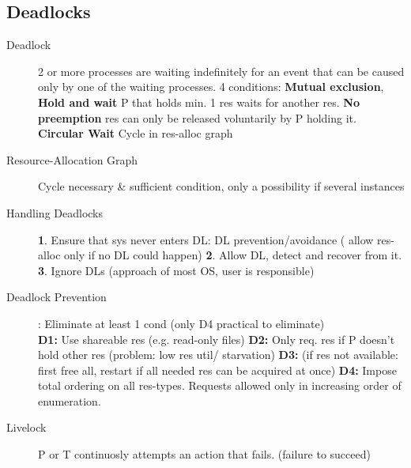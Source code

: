 \subsection*{Deadlocks}
\begin{description}
    \item[Deadlock]2 or more processes are waiting indefinitely for an event that can be caused only by one of the waiting processes. 4 conditions: \textbf{Mutual exclusion}, \textbf{Hold and wait} P that holds min. 1 res waits for another res. \textbf{No preemption} res can only be released voluntarily by P holding it. \textbf{Circular Wait} Cycle in res-alloc graph
    \item[Resource-Allocation Graph] Cycle necessary \& sufficient condition, only a possibility if several instances%
    \item[Handling Deadlocks]\textbf{1}. Ensure that sys never enters DL: DL prevention/avoidance ( allow res-alloc only if no DL could happen) \textbf{2}. Allow DL, detect and recover from it. \textbf{3}. Ignore DLs (approach of most OS, user is responsible)
    \item[Deadlock Prevention]: Eliminate at least 1 cond (only D4 practical to eliminate) \\
    \textbf{D1:} Use shareable res (e.g. read-only files) \textbf{D2:} Only req. res if P doesn’t hold other res (problem: low res util/ starvation) \textbf{D3:} (if res not available: first free all, restart if all needed res can be acquired at once) \textbf{D4:} Impose total ordering on all res-types. Requests allowed only in increasing order of enumeration.
    \item[Livelock] P or T continuosly attempts an action that fails. (failure to succeed) %
\end{description}

